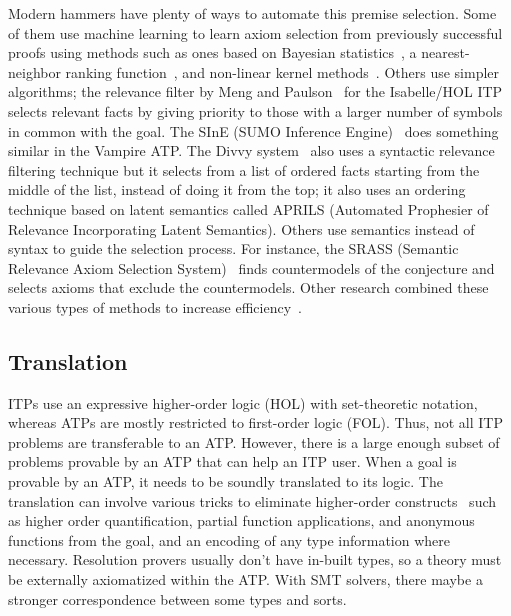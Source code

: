 \documentclass{article}
\begin{document}
		Modern hammers have plenty of ways to 
		automate this premise selection. Some of them use 
		machine learning to learn axiom selection from 
		previously successful proofs using methods such as 
		ones based on Bayesian 
		statistics~\cite{DBLP:journals/jar/AlamaHKTU14}, 
		a nearest-neighbor ranking 
		function~\cite{DBLP:conf/cade/KaliszykU13a}, and
		non-linear kernel
		methods~\cite{DBLP:journals/jar/AlamaHKTU14}.
		Others use simpler algorithms; the relevance filter 
		by Meng and Paulson~\cite{DBLP:journals/japll/MengP09}
		for the Isabelle/HOL ITP selects relevant facts by 
		giving priority to those with a larger number of 
		symbols in common with the goal. The SInE 
		(SUMO Inference 
		Engine)~\cite{10.1007/978-3-642-22438-6_23} does
		something similar in the Vampire ATP. The Divvy 
		system~\cite{10.1007/978-3-642-02959-2_13} also 
		uses a syntactic relevance filtering technique but 
		it selects from a list of ordered facts 
		starting from the middle of the list, instead of 
		doing it from the top; it also uses an ordering 
		technique based on latent semantics called 
		APRILS (Automated Prophesier of Relevance 
		Incorporating Latent Semantics). Others use 
		semantics instead of syntax to guide the 
		selection process. For instance, the SRASS 
		(Semantic Relevance Axiom Selection 
		System)~\cite{10.1007/978-3-540-73595-3_20} 
		finds countermodels of the conjecture and selects 
		axioms that	exclude the countermodels. Other research combined these various types of methods to increase efficiency~\cite{DBLP:journals/corr/KaliszykU13b, 
		10.1007/978-3-642-31365-3_30}.
		
		\subsection{Translation}
		ITPs use an expressive higher-order logic
		(HOL) with set-theoretic notation, whereas ATPs 
		are mostly restricted to first-order logic (FOL). 
		Thus, not all ITP problems are transferable to 
		an ATP. However, there is a large enough subset 
		of problems provable by an ATP that can help an 
		ITP user. When a goal is provable by an ATP, it 
		needs to be soundly translated to its logic. 
		The translation can involve various tricks to 
		eliminate higher-order 
		constructs~\cite{DBLP:journals/jar/MengP08} 
		such as higher order quantification, partial 
		function applications, and anonymous functions
		from the goal, and an encoding of any 
		type information where necessary. Resolution 
		provers usually don't have in-built types, so a 
		theory must be externally axiomatized within the 
		ATP. With SMT solvers, there maybe a stronger
		correspondence between some types and 
		sorts.
	
\end{document}
